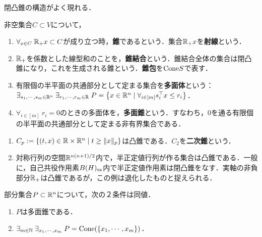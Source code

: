 \documentclass[uplatex,dvipdfmx]{jsreport}
\begin{document}
\begin{tcolorbox}[colframe=ForestGreen, colback=ForestGreen!10!white,breakable,colbacktitle=ForestGreen!40!white,coltitle=black,fonttitle=\bfseries\sffamily,
title=]
    閉凸錐の構造がよく現れる．
\end{tcolorbox}

\begin{definition}
    非空集合$C\subset V$について，
    \begin{enumerate}
        \item $\forall_{x\in C}\;\mathbb{R}_+x\subset C$が成り立つ時，\textbf{錐}であるという．集合$\mathbb{R}_+x$を\textbf{射線}という．
        \item $\mathbb{R}_+$を係数とした線型和のことを，\textbf{錐結合}という．錐結合全体の集合は閉凸錐になり，これを生成される錐という．\textbf{錐包}を$\mathrm{Cone} S$で表す．
        \item 有限個の半平面の共通部分として定まる集合を\textbf{多面体}という：$\exists_{s_1,\cdots,s_m\in\mathbb{R}^n}\;\exists_{r_1,\cdots,r_m\in\mathbb{R}}\;P=\left\{x\in\mathbb{R}^n\mid\forall_{i\in[m]} s_i^\top x\le r_i\right\}$．
        \item $\forall_{i\in[m]}\;r_i=0$のときの多面体を，\textbf{多面錐}という．すなわち，$0$を通る有限個の半平面の共通部分として定まる非有界集合である．
    \end{enumerate}
\end{definition}

\begin{example}\mbox{}
    \begin{enumerate}
        \item $C_p:=\left\{(t,x)\in\mathbb{R}\times\mathbb{R}^n\mid t\ge\|x\|_p\right\}$は凸錐である．$C_2$を\textbf{二次錐}という．
        \item 対称行列の空間$\mathbb{R}^{n(n+1)/2}$内で，半正定値行列が作る集合は凸錐である．一般に，自己共役作用素$B(H)_{\mathrm{sa}}$内で半正定値作用素は閉凸錐をなす．実軸の非負部分$\mathbb{R}_+$は凸錐であるが，この例は退化したものと捉えられる．
    \end{enumerate}
\end{example}


\begin{lemma}[多面錐の特徴付け]
    部分集合$P\subset\mathbb{R}^n$について，次の２条件は同値．
    \begin{enumerate}
        \item $P$は多面錐である．
        \item $\exists_{m\in\mathbb{N}}\;\exists_{x_1,\cdots,x_m}\;P=\mathrm{Cone}(\{x_1,\cdots,x_m\})$．
    \end{enumerate}
\end{lemma}
\end{document}
